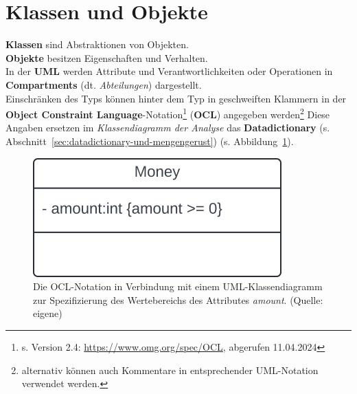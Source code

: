 \section{Klassen und Objekte}

\noindent
\textbf{Klassen} sind Abstraktionen von Objekten.\\

\noindent
\textbf{Objekte} besitzen Eigenschaften und Verhalten.\\

\noindent
In der \textbf{UML} werden Attribute und Verantwortlichkeiten oder Operationen in \textbf{Compartments} (dt. \textit{Abteilungen}) dargestellt.\\

\noindent
Einschränken des Typs können hinter dem Typ in geschweiften Klammern in der \textbf{Object Constraint Language}-Notation\footnote{
s. Version 2.4: \url{https://www.omg.org/spec/OCL}, abgerufen 11.04.2024
} (\textbf{OCL}) angegeben werden\footnote{
alternativ können auch Kommentare in entsprechender UML-Notation verwendet werden.
}
Diese Angaben ersetzen im \textit{Klassendiagramm der Analyse} das \textbf{Datadictionary} (s. Abschnitt~\ref{sec:datadictionary-und-mengengerust}) (s. Abbildung~\ref{fig:moneyocl}).

\begin{figure}
    \centering
    \includegraphics[scale=0.4]{part two/Objektorientierte Analyse/img/moneyocl}
    \caption{Die OCL-Notation in Verbindung mit einem UML-Klassendiagramm zur Spezifizierung des Wertebereichs des Attributes \textit{amount}. (Quelle: eigene)}
    \label{fig:moneyocl}
\end{figure}